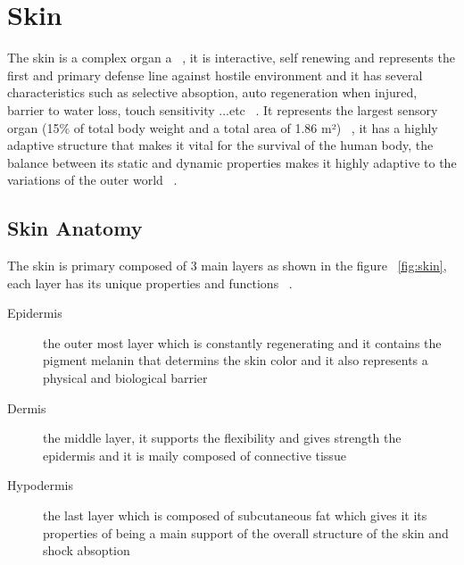 \section{Skin}
The skin is a complex organ a ~\cite{elin2018}, it is interactive, self renewing and represents the first and primary defense line against hostile environment and it has several characteristics such as selective absoption, auto regeneration when injured, barrier to water loss, touch sensitivity ...etc ~\cite{joseph2020}. It represents the largest sensory organ (15\% of total body weight and a total area of 1.86 m²) ~\cite{sarah2021}, it has a highly adaptive structure that makes it vital for the survival of the human body, the balance between its static and dynamic properties makes it highly adaptive to the variations of the outer world ~\cite{eliana2022}.

\subsection{Skin Anatomy}
The skin is primary composed of 3 main layers as shown in the figure ~\ref{fig:skin}, each layer has its unique properties and functions ~\cite{sarah2021}.
\begin{description}
\item[Epidermis] the outer most layer which is constantly regenerating and it contains the pigment melanin that determins the skin color and it also represents a physical and biological barrier
\item[Dermis] the middle layer, it supports the flexibility and gives strength the epidermis and it is maily composed of connective tissue
\item[Hypodermis] the last layer which is composed of subcutaneous fat which gives it its properties of being a main support of the overall structure of the skin and shock absoption
\end{description}


